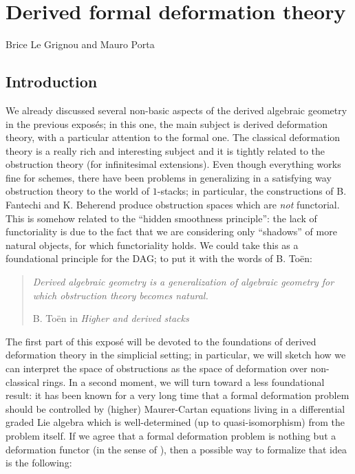\chapter{Derived formal deformation theory}
\begin{flushright}
  Brice Le Grignou and Mauro Porta
\end{flushright}

\begin{refsection}

\section{Introduction}

We already discussed several non-basic aspects of the derived algebraic geometry in the previous expos\'es; in this one, the main subject is derived deformation theory, with a particular attention to the formal one. The classical deformation theory is a really rich and interesting subject and it is tightly related to the obstruction theory (for infinitesimal extensions). Even though everything works fine for schemes, there have been problems in generalizing in a satisfying way obstruction theory to the world of $1$-stacks; in particular, the constructions of B. Fantechi and K. Beherend produce obstruction spaces which are \emph{not} functorial. This is somehow related to the ``hidden smoothness principle'': the lack of functoriality is due to the fact that we are considering only ``shadows'' of more natural objects, for which functoriality holds. We could take this as a foundational principle for the DAG; to put it with the words of B. To\"en:

\begin{quote}
\emph{Derived algebraic geometry is a generalization of algebraic geometry for which obstruction theory becomes natural.}
\begin{flushright}
B. To\"en in \emph{Higher and derived stacks}
\end{flushright}
\end{quote}

The first part of this expos\'e will be devoted to the foundations of derived deformation theory in the simplicial setting; in particular, we will sketch how we can interpret the space of obstructions as the space of deformation over non-classical rings. In a second moment, we will turn toward a less foundational result: it has been known for a very long time that a formal deformation problem should be controlled by (higher) Maurer-Cartan equations living in a differential graded Lie algebra which is well-determined (up to quasi-isomorphism) from the problem itself. If we agree that a formal deformation problem is nothing but a deformation functor (in the sense of \cite[Definition V.61]{manetti}), then a possible way to formalize that idea is the following:


\end{refsection}

